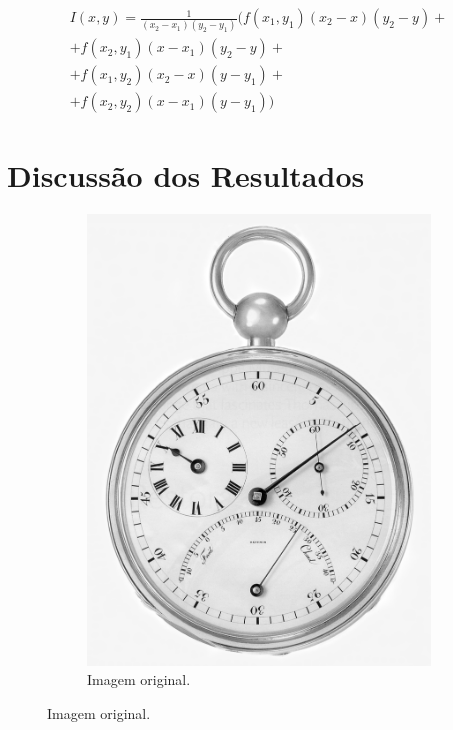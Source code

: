 \documentclass{article}
\begin{document}
        \begin{eqnarray}
            I(x, y) = \frac{1}{(x_2-x_1)(y_2-y_1)}( f(x_1, y_1)(x_2-x)(y_2-y) + \\
             + f(x_2, y_1)(x-x_1)(y_2-y) + \nonumber \\
             + f(x_1, y_2)(x_2-x)(y-y_1)+  \nonumber\\ 
             + f(x_2, y_2)(x-x_1)(y-y_1) ) \nonumber
        \end{eqnarray}

\section{Discussão dos Resultados}
\begin{figure}[h]
    \centering
        \begin{subfigure}[b]{0.3\textwidth}
            \includegraphics[width=\textwidth]{figures/clock_original.tif.png}
            \caption{Imagem original.}
            \label{fig:clock_original}

\end{subfigure}
\end{figure}
\end{document}
